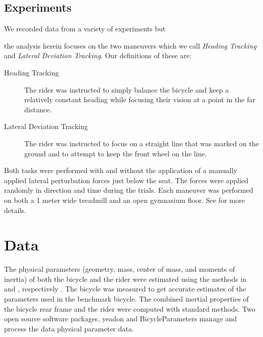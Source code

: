 \documentclass[a4paper]{article}
\begin{document}

\subsection{Experiments}
We recorded data from a variety of experiments \cite{Moore2012} but %

the analysis herein focuses on the two maneuvers which we call \emph{Heading
Tracking} and \emph{Lateral Deviation Tracking}. Our definitions of these are:

\begin{description}
  \item[Heading Tracking]
    The rider was instructed to simply balance the bicycle and keep a
    relatively constant heading while focusing their vision at a point in the
    far distance.
  \item[Lateral Deviation Tracking]
    The rider was instructed to focus on a straight line that was marked on the
    ground and to attempt to keep the front wheel on the line.
\end{description}

Both tasks were performed with and without the application of a manually
applied lateral perturbation forces just below the seat. The forces were
applied randomly in direction and time during the trials. Each maneuver was
performed on both a 1 meter wide treadmill and an open gymnasium floor. See
\cite{Moore2012} for more details.

\section{Data}

The physical parameters (geometry, mass, center of mass, and moments of
inertia) of both the bicycle and the rider were estimated using the methods in
\cite{Moore2012} and \cite{Yeadon1990}, respectively %
. The bicycle was measured
to get accurate estimates of the parameters used in the benchmark bicycle. %
The
combined inertial properties of the bicycle rear frame and the rider were
computed with standard methods. Two open source software packages, yeadon
\cite{Dembia2011} and BicycleParameters \cite{Moore2011} manage and process the
data physical parameter data. %
\end{document}
